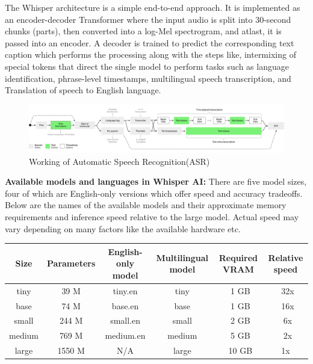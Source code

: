 \documentclass[12px, a4paper]{article}
\begin{document}
The Whisper architecture is a simple end-to-end approach. It is implemented as an encoder-decoder Transformer where the input audio is split into 30-second chunks (parts), then converted into a log-Mel spectrogram, and atlast, it is passed into an encoder. A decoder is trained to predict the corresponding text caption which performs the processing along with the steps like, intermixing of special tokens that direct the single model to perform tasks such as language identification, phrase-level timestamps, multilingual speech transcription, and Translation of speech to English language.

\begin{figure}[!htb]
    \includegraphics[width=\textwidth]{asr-details.png}
    \caption{Working of Automatic Speech Recognition(ASR)}
\end{figure}

\textbf{Available models and languages in Whisper AI:}
There are five model sizes, four of which are English-only versions which offer speed and accuracy tradeoffs. Below are the names of the available models and their approximate memory requirements and inference speed relative to the large model. Actual speed may vary depending on many factors like the available hardware etc.

\begin{table}[!h]
    \centering
    \begin{tabular}{|c|c|c|c|c|c|}
        \hline
        \textbf{Size} & \textbf{Parameters} & \textbf{English-only model} & \textbf{Multilingual model} & \textbf{Required VRAM} & \textbf{Relative speed}\\
        \hline
        tiny & 39 M & tiny.en & tiny & ~1 GB & ~32x\\
        \hline
        base & 74 M & base.en & base & ~1 GB & ~16x\\
        \hline
        small & 244 M & small.en & small & ~2 GB & ~6x\\
        \hline
        medium & 769 M & medium.en & medium & ~5 GB & ~2x\\
        \hline
        large & 1550 M & N/A & large & ~10 GB & 1x\\
        \hline
    \end{tabular}
\end{table}
\end{document}
